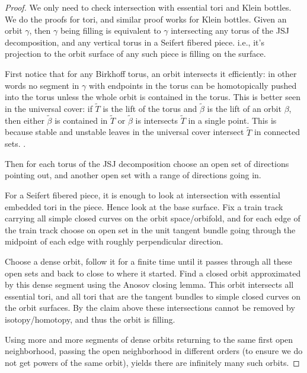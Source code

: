 \documentclass[12pt]{amsart}
\theoremstyle{definition}
\theoremstyle{remark}
\begin{document}
\begin{proof}
We only need to check intersection with essential tori and Klein bottles. We do the proofs for tori, and similar proof works for Klein bottles.
 Given an orbit $\gamma$, then $\gamma$ being filling is equivalent to $\gamma$ intersecting any torus of the JSJ decomposition, and any vertical torus in a Seifert fibered piece. i.e., it's projection to the orbit surface of any such piece is filling on the surface.

   First notice that for any Birkhoff torus, an orbit intersects it efficiently:  in other words no segment in $\gamma$ with endpoints
   in the torus can be homotopically pushed into the torus unless the
   whole orbit is contained in the torus. This is better seen in the
   universal cover: if $\tilde T$ is the lift of the torus and
   $\tilde \beta$ is the lift of an orbit $\beta$, then either 
   $\tilde \beta$ is contained in $\tilde T$ or $\tilde \beta$ is 
   intersects $\tilde T$ in a single point. This is because stable and
   unstable leaves in the universal cover intersect $\tilde T$ in connected sets. \cite{BarbotFenley2021Free}.
   
   Then for each torus of the JSJ decomposition choose an open set of directions pointing out, and another open set with a range of directions going in.

   For a Seifert fibered piece, it is enough to look at intersection
   with essential embedded tori in the piece. Hence look at the base surface. Fix a train track carrying all simple closed curves on the orbit space/orbifold, and for each edge of the train track choose on open set in the unit tangent bundle going through the midpoint of each edge with roughly perpendicular direction. 

   Choose a dense orbit, follow it for a finite time until it passes through all these open sets and back to close to where it started. Find a closed orbit approximated by this dense segment using the Anosov closing lemma. This orbit intersects all essential tori, and all tori that are the tangent bundles to simple closed curves on the orbit surfaces. By the  claim above these intersections cannot be removed by isotopy/homotopy, and thus the orbit is filling.

   Using more and more segments of dense orbits returning to the same first open neighborhood, passing the open neighborhood in different orders (to ensure we do not get powers of the same orbit), yields there are infinitely many such orbits.
\end{proof}
\end{document}
